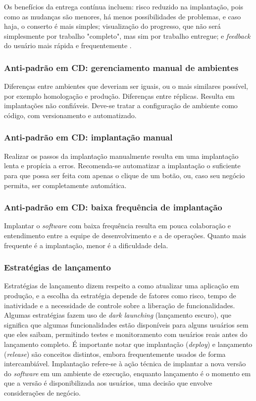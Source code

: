 Os benefícios da entrega contínua incluem: risco reduzido na implantação, pois como as mudanças são menores, há menos possibilidades de problemas, e caso haja, o conserto é mais simples; visualização do progresso, que não será simplesmente por trabalho "completo", mas sim por trabalho entregue; e \emph{feedback} do usuário mais rápida e frequentemente \cite{martin-fowler-continuous-delivery}.

\subsubsection*{Anti-padrão em CD: gerenciamento manual de ambientes}
Diferenças entre ambientes que deveriam ser iguais, ou o mais similares possível, por exemplo homologação e produção. Diferenças entre réplicas. Resulta em implantações não confiáveis. Deve-se tratar a configuração de ambiente como código, com versionamento e automatizado. \cite{continuous-delivery-jez-humble}

\subsubsection*{Anti-padrão em CD: implantação manual}
Realizar os passos da implantação manualmente resulta em uma implantação lenta e propícia a erros. Recomenda-se automatizar a implantação o suficiente para que possa ser feita com apenas o clique de um botão, ou, caso seu negócio permita, ser completamente automática. \cite{continuous-delivery-jez-humble}

\subsubsection*{Anti-padrão em CD: baixa frequência de implantação}
Implantar o \emph{software} com baixa frequência resulta em pouca colaboração e entendimento entre a equipe de desenvolvimento e a de operações. Quanto mais frequente é a implantação, menor é a dificuldade dela. \cite{continuous-delivery-jez-humble, martin-fowler-frequency}

\subsubsection{Estratégias de lançamento}\label{estrategias-implantacao}
Estratégias de lançamento dizem respeito a como atualizar uma aplicação em produção, e a escolha da estratégia depende de fatores como risco, tempo de inatividade e a necessidade de controle sobre a liberação de funcionalidades. Algumas estratégias fazem uso de \emph{dark launching} (lançamento escuro), que significa que algumas funcionalidades estão disponíveis para alguns usuários sem que eles saibam, permitindo testes e monitoramento com usuários reais antes do lançamento completo. É importante notar que implantação (\emph{deploy}) e lançamento (\emph{release}) são conceitos distintos, embora frequentemente usados de forma intercambiável. Implantação refere-se à ação técnica de implantar a nova versão do \emph{software} em um ambiente de execução, enquanto lançamento é o momento em que a versão é disponibilizada aos usuários, uma decisão que envolve considerações de negócio.

